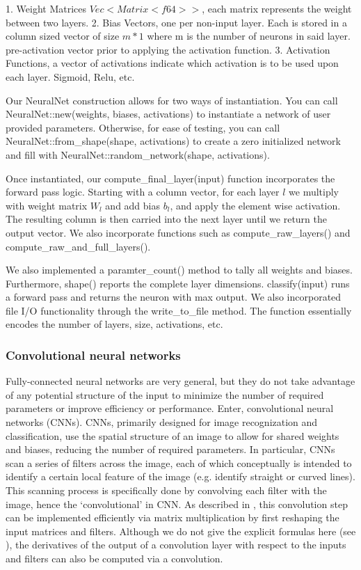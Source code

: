 1. Weight Matrices $Vec<Matrix<f64>>$, each matrix represents the weight between two layers. 
2. Bias Vectors, one per non-input layer. Each is stored in a column sized vector of size $m * 1$ where m is the number of neurons in said layer. 
pre-activation vector prior to applying the activation function. 
3. Activation Functions, a vector of activations indicate which activation is to be used upon each layer. Sigmoid, Relu, etc. 

Our NeuralNet construction allows for two ways of instantiation. You can call NeuralNet::new(weights, biases, activations) 
to instantiate a network of user provided parameters. Otherwise, for ease of testing, you can call NeuralNet::from_shape(shape, activations)
to create a zero initialized network and fill with NeuralNet::random_network(shape, activations). 

Once instantiated, our compute_final_layer(input) function incorporates the forward pass logic. Starting with a column vector, for each layer 
$l$ we multiply with weight matrix $W_l$ and add bias $b_l$, and apply the element wise activation. The resulting column is then 
carried into the next layer until we return the output vector. We also incorporate functions such as compute_raw_layers() and compute_raw_and_full_layers(). 

We also implemented a paramter_count() method to tally all weights and biases. Furthermore, shape() reports the complete layer dimensions. 
classify(input) runs a forward pass and returns the neuron with max output. We also incorporated file I/O functionality through the write_to_file 
method. The function essentially encodes the number of layers, size, activations, etc.  



\subsubsection{Convolutional neural networks}
Fully-connected neural networks are very general, but they do not take advantage of any potential structure of the input to minimize the number of required parameters or improve efficiency or performance.
Enter, convolutional neural networks (CNNs).
CNNs, primarily designed for image recognization and classification, use the spatial structure of an image to allow for shared weights and biases, reducing the number of required parameters.
In particular, CNNs scan a series of filters across the image, each of which conceptually is intended to identify a certain local feature of the image (e.g. identify straight or curved lines).
This scanning process is specifically done by convolving each filter with the image, hence the `convolutional' in CNN.
As described in \textcolor{blue}{\autocite{Making_faster}}, this convolution step can be implemented efficiently via matrix multiplication by first reshaping the input matrices and filters.
Although we do not give the explicit formulas here (see \textcolor{blue}{\autocite{Solai_2018}}), the derivatives of the output of a convolution layer with respect to the inputs and filters can also be computed via a convolution.

